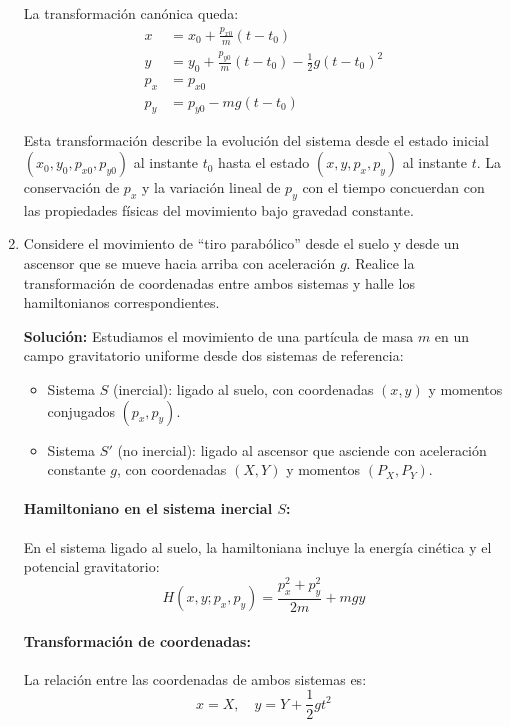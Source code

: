 \documentclass[12pt]{article}
\begin{document}
\begin{enumerate}
  La transformación canónica queda:
  \begin{align}
  x &= x_0 + \frac{p_{x0}}{m}(t-t_0) \\
  y &= y_0 + \frac{p_{y0}}{m}(t-t_0) - \frac{1}{2}g(t-t_0)^2 \\
  p_x &= p_{x0} \\
  p_y &= p_{y0} - mg(t-t_0)
  \end{align}

  Esta transformación describe la evolución del sistema desde el estado inicial \\
   $(x_0,y_0,p_{x0},p_{y0})$ al instante $t_0$ hasta el estado $(x,y,p_x,p_y)$ al instante $t$. La conservación de $p_x$ y la variación lineal de $p_y$ con el tiempo concuerdan con las propiedades físicas del movimiento bajo gravedad constante.

  \item Considere el movimiento de “tiro parabólico” desde el suelo y desde un ascensor que se mueve hacia arriba con aceleración \(g\). Realice la transformación de coordenadas entre ambos sistemas y halle los hamiltonianos correspondientes.
  
  \textbf{Solución:}  
  Estudiamos el movimiento de una partícula de masa $m$ en un campo gravitatorio uniforme desde dos sistemas de referencia:

  \begin{itemize}
  \item Sistema $S$ (inercial): ligado al suelo, con coordenadas $(x,y)$ y momentos conjugados $(p_x,p_y)$.
  \item Sistema $S'$ (no inercial): ligado al ascensor que asciende con aceleración constante $g$, con coordenadas $(X,Y)$ y momentos $(P_X,P_Y)$.
  \end{itemize}

  \paragraph{Hamiltoniano en el sistema inercial $S$:}
  En el sistema ligado al suelo, la hamiltoniana incluye la energía cinética y el potencial gravitatorio:
  \[
  H(x,y;p_x,p_y) = \frac{p_x^2+p_y^2}{2m} + mgy
  \]

  \paragraph{Transformación de coordenadas:}
  La relación entre las coordenadas de ambos sistemas es:
  \[
  x = X, \quad y = Y + \frac{1}{2}gt^2
  \]


\end{enumerate}
\end{document}
